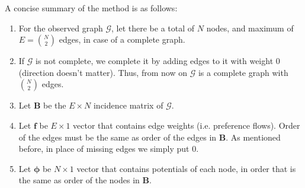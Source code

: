 \documentclass[letterpaper, 10 pt, conference]{ieeeconf}
\newcommand{\matr}[1]{\mathbold{#1}}
\newcommand{\graph}[1]{\bm{\mathcal{#1}}}
\begin{document}
  A concise summary of the method is as follows:
  \begin{enumerate}
    \item For the observed graph $\graph{G}$, let there be a total of $N$ nodes, and maximum of $E = \binom{N}{2}$ edges, in case of a complete graph.
    
    \item If $\graph{G}$ is not complete, we complete it by adding edges to it with weight 0 (direction doesn't matter).
    Thus, from now on $\graph{G}$ is a complete graph with $\binom{N}{2}$ edges.
    
    \item Let $\matr{B}$ be the $E \times N$ incidence matrix of $\graph{G}$.

    \item Let $\matr{f}$ be $E \times 1$ vector that contains edge weights (i.e. preference flows).
    Order of the edges must be the same as order of the edges in $\matr{B}$.
    As mentioned before, in place of missing edges we simply put 0.
    
    \item Let $\matr{\phi}$ be $N \times 1$ vector that contains potentials of each node, in order that is the same as order of the nodes in $\matr{B}$.
    

\end{enumerate}
\end{document}
